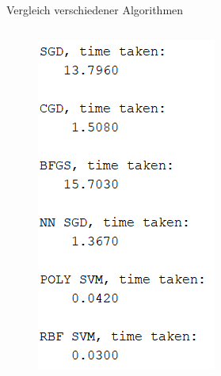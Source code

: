 \documentclass[ngerman]{beamer}
\begin{document}
\begin{frame}{Vergleich verschiedener Algorithmen}
    \begin{columns}
        \begin{column}{0.4\textwidth}
            \begin{figure}
                \includegraphics[width=\textwidth,height=0.7\textheight,keepaspectratio]{../code/octave/images/compbatchtimes}

\end{figure}
\end{column}
\end{columns}
\end{frame}
\end{document}
